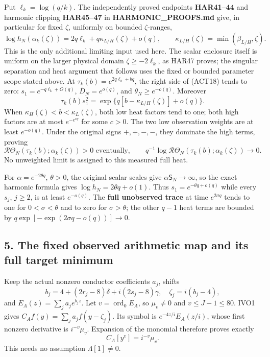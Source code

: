 \documentclass[11pt]{article}
\begin{document}
Put \(\ell_k=\log(q/k)\). The independently proved endpoints \textbf{HAR41--44} and harmonic clipping \textbf{HAR45--47} in \textbf{HARMONIC\_PROOFS.md} give, in particular for fixed \(\zeta\), uniformly on bounded \(\zeta\)-ranges, \[
\log h_N(\alpha_k(\zeta))=2q\ell_k+q\kappa_{L/H}(\zeta)+o(q),\qquad
\kappa_{L/H}(\zeta)=\min(\beta_{L/H},\zeta).
\tag{ACT19}
\] This is the only additional limiting input used here. The scalar enclosure itself is uniform on the larger physical domain \(\zeta\ge-2\ell_k\), as HAR47 proves; the singular separation and heat argument that follows uses the fixed or bounded parameter scope stated above. At \(\tau_k(b)=e^{2q\ell_k+bq}\), the right side of (ACT18) tends to zero: \(s_1=e^{-q\ell_k+O(q)}\), \(\overline D_N=e^{o(q)}\), and \(\theta_N\ge e^{-o(q)}\). Moreover \[
\tau_k(b)s_1^2=\exp\{q[b-\kappa_{L/H}(\zeta)]+o(q)\}.
\] When \(\kappa_H(\zeta)<b<\kappa_L(\zeta)\), both low heat factors tend to one; both high factors are at most \(e^{-e^{cq}}\) for some \(c>0\). The two low observation weights are at least \(e^{-o(q)}\). Under the original signs \(+,+,-,-\), they dominate the high terms, proving \[
\mathcal R\Theta_N(\tau_k(b);\alpha_k(\zeta))>0\text{ eventually},\qquad
q^{-1}\log\mathcal R\Theta_N(\tau_k(b);\alpha_k(\zeta))\to0.
\tag{ACT20}
\] No unweighted limit is assigned to this measured full heat.

For \(\alpha=e^{-2\theta q}\), \(\theta>0\), the original scalar scales give \(\alpha\mathsf S_N\to\infty\), so the exact harmonic formula gives \(\log h_N=2\theta q+o(1)\). Thus \(s_1=e^{-\theta q+o(q)}\) while every \(s_j\), \(j\ge2\), is at least \(e^{-o(q)}\). The \textbf{full unobserved trace} at time \(e^{2\sigma q}\) tends to one for \(0<\sigma<\theta\) and to zero for \(\sigma>\theta\); the other \(q-1\) heat terms are bounded by \(q\exp[-\exp(2\sigma q-o(q))]\to0\).

\subsection{5. The fixed observed arithmetic map and its full target minimum}\label{the-fixed-observed-arithmetic-map-and-its-full-target-minimum}

Keep the actual nonzero conductor coefficients \(a_j\), shifts \[
b_j=4+(2r_j-8)\delta+i(2s_j-8)\gamma,\quad \zeta_j=i(b_j-4),
\] and \(E_A(z)=\sum_ja_je^{b_jz}\). Let \(v=\operatorname{ord}_0E_A\), so \(\mu_v\ne0\) and \(v\le J-1\le80\). IVO1 gives \(C_Af(y)=\sum_ja_jf(y-\zeta_j)\). Its symbol is \(e^{-4z/i}E_A(z/i)\), whose first nonzero derivative is \(i^{-v}\mu_v\). Expansion of the monomial therefore proves exactly \[
C_A[y^v]=i^{-v}\mu_v.
\tag{ACT21}
\] This needs no assumption \(\Lambda[1]\ne0\).
\end{document}
